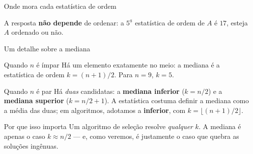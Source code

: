 \documentclass[aspectratio=169]{beamer}
\begin{document}
\begin{frame}{Onde mora cada estatística de ordem}
  \begin{center}
  \end{center}

  \begin{center}
    \small A resposta \textbf{não depende} de ordenar: a $5^{\underline{a}}$
    estatística de ordem de $A$ é $17$, esteja $A$ ordenado ou não.
  \end{center}
\end{frame}

\begin{frame}{Um detalhe sobre a mediana}
  \begin{block}{Quando $n$ é ímpar}
    Há um elemento exatamente no meio: a mediana é a estatística de ordem
    $k = (n+1)/2$. Para $n = 9$, $k = 5$.
  \end{block}

  \begin{block}{Quando $n$ é par}
    Há \emph{duas} candidatas: a \textbf{mediana inferior}
    ($k = n/2$) e a \textbf{mediana superior} ($k = n/2 + 1$).
    A estatística costuma definir a mediana como a média das duas; em
    algoritmos, adotamos a \textbf{inferior}, com
    $k = \lfloor (n+1)/2 \rfloor$.
  \end{block}

  \begin{exampleblock}{Por que isso importa}
    Um algoritmo de seleção resolve \emph{qualquer} $k$. A mediana é apenas o
    caso $k \approx n/2$ --- e, como veremos, é justamente o caso que quebra as
    soluções ingênuas.
  \end{exampleblock}
\end{frame}
\end{document}
